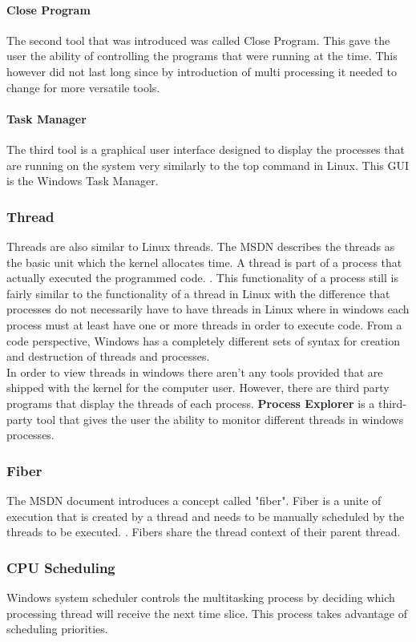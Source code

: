 \documentclass[journal,10pt,onecolumn,compsoc,letterpaper,draftclsnofoot,table,xcdraw]{IEEEtran} \usepackage[margin=0.75in]{geometry}
\begin{document}
\paragraph{Close Program} The second tool that was introduced was called Close Program. This gave the user the ability of controlling the programs that were running at the time. This however did not last long since by introduction of multi processing it needed to change for more versatile tools.
\paragraph{Task Manager} The third tool is a graphical user interface designed to display the processes that are running on the system very similarly to the top command in Linux. This GUI is the Windows Task Manager. 
\subsubsection{Thread}
\noindent Threads are also similar to Linux threads. The MSDN describes the threads as the basic unit which the kernel allocates time. A thread is part of a process that actually executed the programmed code. \cite{msdnprocess}. This functionality of a process still is fairly similar to the functionality of a thread in Linux with the difference that processes do not necessarily have to have threads in Linux where in windows each process must at least have one or more threads in order to execute code. From a code perspective, Windows has a completely different sets of syntax for creation and destruction of threads and processes.\\
\noindent In order to view threads in windows there aren't any tools provided that are shipped with the kernel for the computer user. However, there are third party programs that display the threads of each process. \textbf{Process Explorer} is a third-party tool that gives the user the ability to monitor different threads in windows processes.
\subsubsection{Fiber}
\noindent The MSDN document \cite{msdnprocess} introduces a concept called "fiber". Fiber is a unite of execution that is created by a thread and needs to be manually scheduled by the threads to be executed. \cite{msdnprocess}. Fibers share the thread context of their parent thread.
\subsubsection{CPU Scheduling}
\noindent Windows system scheduler controls the multitasking process by deciding which processing thread will receive the next time slice. This process takes advantage of scheduling priorities.
\end{document}
